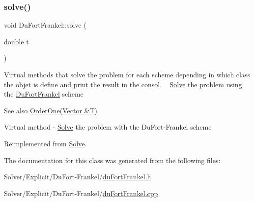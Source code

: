 \subsubsection{\texorpdfstring{solve()}{solve()}}
{\footnotesize\ttfamily void Du\+Fort\+Frankel\+::solve (\begin{DoxyParamCaption}\item[{double}]{t }\end{DoxyParamCaption})\hspace{0.3cm}{\ttfamily [virtual]}}

Virtual methods that solve the problem for each scheme depending in which class the objet is define and print the result in the consol. ~\newline
 \hyperlink{class_solve}{Solve} the problem using the \hyperlink{class_du_fort_frankel}{Du\+Fort\+Frankel} scheme \begin{DoxySeeAlso}{See also}
\hyperlink{class_explicit_a6069720017eb2bb0d989b2557c162c97}{Order\+One(\+Vector \&\+T)}
\end{DoxySeeAlso}
Virtual method -\/ \hyperlink{class_solve}{Solve} the problem with the Du\+Fort-\/\+Frankel scheme 

Reimplemented from \hyperlink{class_solve_a1a56722993fdabea9928637d7dd8a2c7}{Solve}.



The documentation for this class was generated from the following files\+:\begin{DoxyCompactItemize}
\item 
Solver/\+Explicit/\+Du\+Fort-\/\+Frankel/\hyperlink{du_fort_frankel_8h}{du\+Fort\+Frankel.\+h}\item 
Solver/\+Explicit/\+Du\+Fort-\/\+Frankel/\hyperlink{du_fort_frankel_8cpp}{du\+Fort\+Frankel.\+cpp}\end{DoxyCompactItemize}
